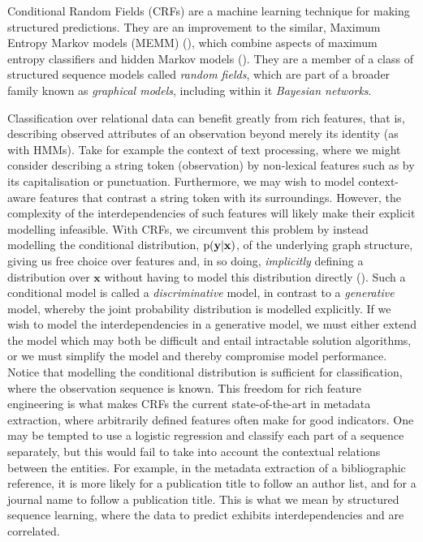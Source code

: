 Conditional Random Fields (CRFs) are a machine learning technique for making structured predictions. They are an improvement to the similar, Maximum Entropy Markov models (MEMM) (\cite{mccallum2000maximum}), which combine aspects of maximum entropy classifiers and hidden Markov models (\cite{lafferty2001conditional}). They are a member of a class of structured sequence models called \emph{random fields}, which are part of a broader family known as \emph{graphical models}, including within it \emph{Bayesian networks}.

Classification over relational data can benefit greatly from rich features, that is, describing observed attributes of an observation beyond merely its identity (as with HMMs). Take for example the context of text processing, where we might consider describing a string token (observation) by non-lexical features such as by its capitalisation or punctuation. Furthermore, we may wish to model context-aware features that contrast a string token with its surroundings. However, the complexity of the interdependencies of such features will likely make their explicit modelling infeasible. With CRFs, we circumvent this problem by instead modelling the conditional distribution, $\text{p}(\mathbf{y}|\mathbf{x})$, of the underlying graph structure, giving us free choice over features and, in so doing, \emph{implicitly} defining a distribution over $\mathbf{x}$ without having to model this distribution directly (\cite{sutton2006introduction}). Such a conditional model is called a \emph{discriminative} model, in contrast to a \emph{generative} model, whereby the joint probability distribution is modelled explicitly. If we wish to model the interdependencies in a generative model, we must either extend the model which may both be difficult and entail intractable solution algorithms, or we must simplify the model and thereby compromise model performance. Notice that modelling the conditional distribution is sufficient for classification, where the observation sequence is known. This freedom for rich feature engineering is what makes CRFs the current state-of-the-art in metadata extraction, where arbitrarily defined features often make for good indicators. One may be tempted to use a logistic regression and classify each part of a sequence separately, but this would fail to take into account the contextual relations between the entities. For example, in the metadata extraction of a bibliographic reference, it is more likely for a publication title to follow an author list, and for a journal name to follow a publication title. This is what we mean by structured sequence learning, where the data to predict exhibits interdependencies and are correlated.

